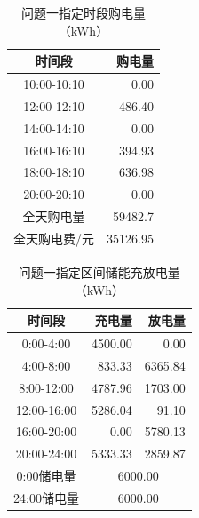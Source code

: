\begin{table}[htbp]\centering
\caption{问题一指定时段购电量（kWh）}\label{tab:q1buy}
\small
\begin{tabular}{cr}
\toprule
时间段 & 购电量 \\
\midrule
10:00-10:10 & 0.00 \\
12:00-12:10 & 486.40 \\
14:00-14:10 & 0.00 \\
16:00-16:10 & 394.93 \\
18:00-18:10 & 636.98 \\
20:00-20:10 & 0.00 \\
\midrule 全天购电量 & 59482.7 \\
全天购电费/元 & 35126.95 \\
\bottomrule
\end{tabular}
\end{table}
\begin{table}[htbp]\centering
\caption{问题一指定区间储能充放电量（kWh）}\label{tab:q1soc}
\small
\begin{tabular}{crr}
\toprule
时间段 & 充电量 & 放电量 \\
\midrule
0:00-4:00 & 4500.00 & 0.00 \\
4:00-8:00 & 833.33 & 6365.84 \\
8:00-12:00 & 4787.96 & 1703.00 \\
12:00-16:00 & 5286.04 & 91.10 \\
16:00-20:00 & 0.00 & 5780.13 \\
20:00-24:00 & 5333.33 & 2859.87 \\
\midrule 0:00储电量 & \multicolumn{2}{c}{6000.00} \\
24:00储电量 & \multicolumn{2}{c}{6000.00} \\
\bottomrule
\end{tabular}
\end{table}
